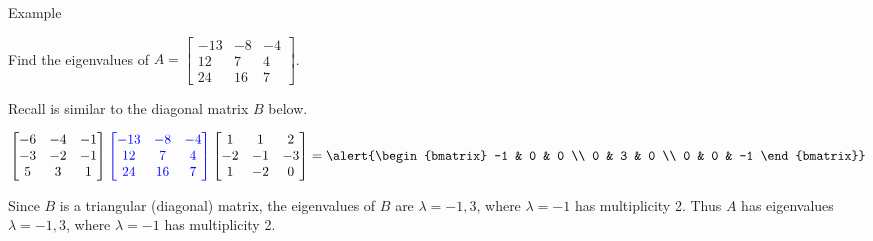 \documentclass[xcolor=dvipsnames,aspectratio=169,t]{beamer}
\begin{document}
\begin{frame}{Example}
  \bigskip

  Find the eigenvalues of $A = \begin{bmatrix} -13 & -8 & -4 \\ 12 & 7 & 4 \\ 24 & 16 & 7 \end{bmatrix}$.
  \vspace*{2em}
  
  \pause
  Recall  is similar to the diagonal matrix \alert{$B$} below.

  \[ \begin{bmatrix} -6 & -4 & -1 \\ -3 & -2 & -1 \\ 5 & 3 & 1 \end{bmatrix}
  \colorb{\begin{bmatrix} -13 & -8 & -4 \\ 12 & 7 & 4 \\ 24 & 16 & 7 \end{bmatrix} }
  \begin{bmatrix} 1 & 1 & 2 \\ -2 & -1 & -3 \\ 1 & -2 & 0 \end{bmatrix}  =
  \alert{\begin{bmatrix} -1 & 0 & 0 \\ 0 & 3 & 0 \\ 0 & 0 & -1 \end{bmatrix}}  \]
  \medskip

  Since $B$ is a triangular (diagonal) matrix, the eigenvalues of $B$ are $\lambda = -1 ,3$, where $\lambda = -1$ has multiplicity 2. Thus $A$ has eigenvalues $\lambda = -1 ,3$, where $\lambda = -1$ has multiplicity 2.
\end{frame}
\end{document}
